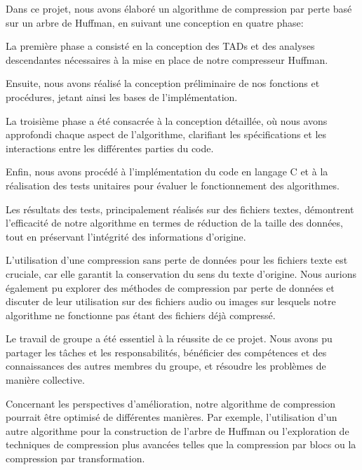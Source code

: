 
Dans ce projet, nous avons élaboré un algorithme de compression par perte basé sur un arbre de Huffman, en suivant une conception en quatre phase:

    La première phase a consisté en la conception des TADs et des analyses descendantes nécessaires à la mise en place de notre compresseur Huffman.

    Ensuite, nous avons réalisé la conception préliminaire de nos fonctions et procédures, jetant ainsi les bases de l'implémentation.

    La troisième phase a été consacrée à la conception détaillée, où nous avons approfondi chaque aspect de l'algorithme, clarifiant les spécifications et les interactions entre les différentes parties du code.

    Enfin, nous avons procédé à l'implémentation du code en langage C et à la réalisation des tests unitaires pour évaluer le fonctionnement des algorithmes.

Les résultats des tests, principalement réalisés sur des fichiers textes, démontrent l'efficacité de notre algorithme en termes de réduction de la taille des données, tout en préservant l'intégrité des informations d'origine.

L'utilisation d'une compression sans perte de données pour les fichiers texte est cruciale, car elle garantit la conservation du sens du texte d'origine. Nous aurions également pu explorer des méthodes de compression par perte de données et discuter de leur utilisation sur des fichiers audio ou images sur lesquels notre algorithme ne fonctionne pas étant des fichiers déjà compressé.

Le travail de groupe a été essentiel à la réussite de ce projet. Nous avons pu partager les tâches et les responsabilités, bénéficier des compétences et des connaissances des autres membres du groupe, et résoudre les problèmes de manière collective.

Concernant les perspectives d'amélioration, notre algorithme de compression pourrait être optimisé de différentes manières. Par exemple, l'utilisation d'un autre algorithme pour la construction de l'arbre de Huffman ou l'exploration de techniques de compression plus avancées telles que la compression par blocs ou la compression par transformation.


